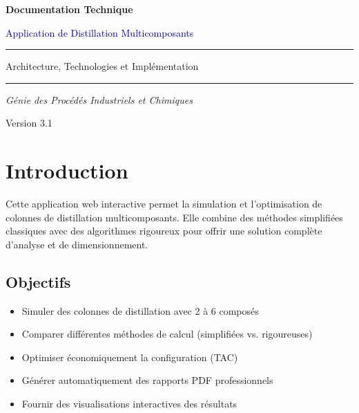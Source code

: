 \documentclass[11pt,a4paper]{article}
\begin{document}
\begin{titlepage}
    \centering
    \vspace*{2cm}

    {\Huge\bfseries\textcolor{titleblue}{Documentation Technique}\par}
    \vspace{1cm}
    {\LARGE\textcolor{darkblue}{Application de Distillation Multicomposants}\par}

    \vspace{2cm}
    \textcolor{lightblue}{\rule{\textwidth}{2pt}}

    \vspace{2cm}

    {\Large Architecture, Technologies et Implémentation\par}

    \vfill

    \textcolor{lightblue}{\rule{\textwidth}{2pt}}
    \vspace{0.5cm}

    {\large\textit{Génie des Procédés Industriels et Chimiques}\par}
    {\normalsize Version 3.1\par}

    \vspace{1cm}
\end{titlepage}

\newpage
\tableofcontents
\thispagestyle{empty}
\clearpage
\setcounter{page}{1}

\section{Introduction}

Cette application web interactive permet la simulation et l'optimisation de colonnes de distillation multicomposants. Elle combine des méthodes simplifiées classiques avec des algorithmes rigoureux pour offrir une solution complète d'analyse et de dimensionnement.

\subsection{Objectifs}

\begin{itemize}
\item Simuler des colonnes de distillation avec 2 à 6 composés
\item Comparer différentes méthodes de calcul (simplifiées vs. rigoureuses)
\item Optimiser économiquement la configuration (TAC)
\item Générer automatiquement des rapports PDF professionnels
\item Fournir des visualisations interactives des résultats
\end{itemize}
\end{document}
